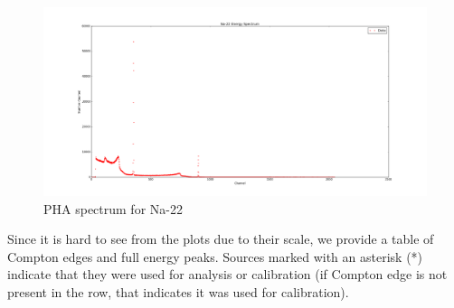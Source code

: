 \documentclass{article}
\begin{document}
\begin{figure}[!htb]
	\centering
	\includegraphics[width = 20cm]{plots/Na-22_Spectrum.png}
  	\caption{PHA spectrum for Na-22} 
 	\label{Na}
\end{figure}

\hspace{.25cm}

Since it is hard to see from the plots due to their scale, we provide a table of Compton edges and full energy peaks. Sources marked with an asterisk (*) indicate that they were used for analysis or calibration (if Compton edge is not present in the row, that indicates it was used for calibration).
\end{document}
